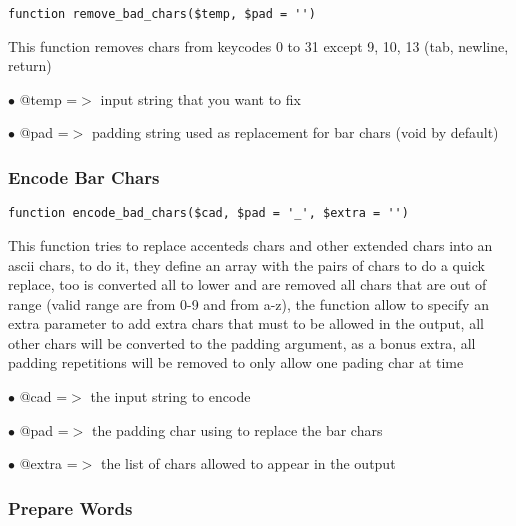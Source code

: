\documentclass[a4paper]{article}
\begin{document}
\begin{lstlisting}
function remove_bad_chars($temp, $pad = '')
\end{lstlisting}

This function removes chars from keycodes 0 to 31 except 9, 10, 13 (tab,
newline, return)

\begin{compactitem}
\item[\color{myblue}$\bullet$] @temp =$>$ input string that you want to fix
\item[\color{myblue}$\bullet$] @pad  =$>$ padding string used as replacement for bar chars (void by default)
\end{compactitem}

\hypertarget{toc239}{}
\subsubsection{Encode Bar Chars}

\begin{lstlisting}
function encode_bad_chars($cad, $pad = '_', $extra = '')
\end{lstlisting}

This function tries to replace accenteds chars and other extended chars into
an ascii chars, to do it, they define an array with the pairs of chars to
do a quick replace, too is converted all to lower and are removed all chars
that are out of range (valid range are from 0-9 and from a-z), the function
allow to specify an extra parameter to add extra chars that must to be
allowed in the output, all other chars will be converted to the padding
argument, as a bonus extra, all padding repetitions will be removed to
only allow one pading char at time

\begin{compactitem}
\item[\color{myblue}$\bullet$] @cad   =$>$ the input string to encode
\item[\color{myblue}$\bullet$] @pad   =$>$ the padding char using to replace the bar chars
\item[\color{myblue}$\bullet$] @extra =$>$ the list of chars allowed to appear in the output
\end{compactitem}

\hypertarget{toc240}{}
\subsubsection{Prepare Words}
\end{document}
